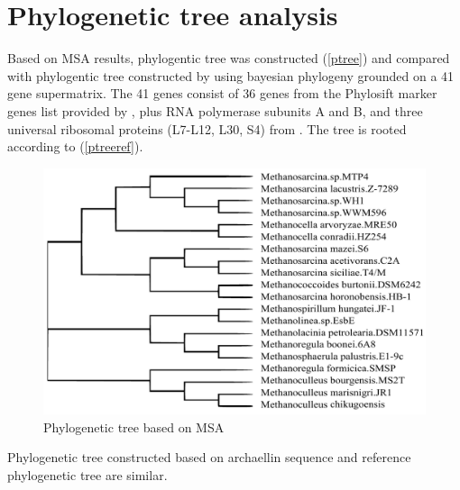 \documentclass[fontsize=12pt,headsepline=true, bibliography=totocnumbered, twoside]{scrbook} %
\begin{document}
\section{Phylogenetic tree analysis}



Based on \ac{MSA} results, phylogentic tree was constructed (\autoref{ptree}) and compared with phylogentic tree constructed by \citet{adam2017growing} using bayesian phylogeny grounded on a 41 gene supermatrix. The 41 genes consist of 36 genes from the Phylosift marker genes list provided by \citet{darling2014phylosift}, plus RNA polymerase subunits A and B, and three universal ribosomal proteins (L7-L12, L30, S4) from \citet{liu2012control}. The tree is rooted according to \citet{raymann2015two} (\autoref{ptreeref}).



\begin{figure}[h]
\center
\includegraphics[scale=0.58]{tree}
\caption{Phylogenetic tree based on MSA}
\label{ptree}
\end{figure}

Phylogenetic tree constructed based on archaellin sequence and reference phylogenetic tree are similar.
\end{document}
